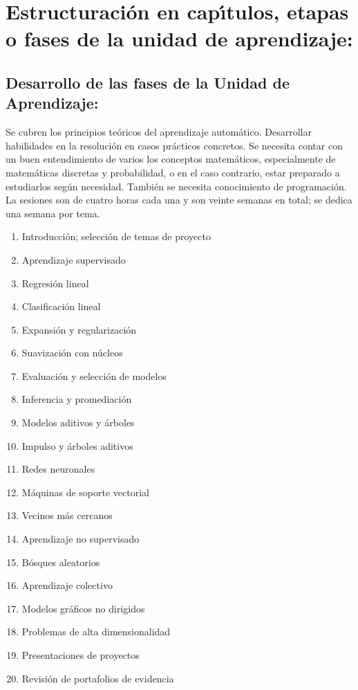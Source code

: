 \documentclass[10 pt]{article}
\begin{document}
\newpage
\section{Estructuraci\'{o}n en cap\'{\i}tulos, etapas o fases de la unidad de
  aprendizaje:}
\subsection{Desarrollo de las fases de la Unidad de Aprendizaje:}

Se cubren los principios te\'{o}ricos del aprendizaje
autom\'{a}tico. Desarrollar habilidades en la resoluci\'{o}n en casos
pr\'{a}cticos concretos. Se necesita contar con un buen entendimiento
de varios los conceptos matem\'{a}ticos, especialmente de
matem\'{a}ticas discretas y probabilidad, o en el caso contrario,
estar preparado a estudiarlos seg\'{u}n necesidad. Tambi\'{e}n se
necesita conocimiento de programaci\'{o}n.  La sesiones son de cuatro
horas cada una y son veinte semanas en total; se dedica una semana por
tema.
\begin{enumerate}[itemsep=-3pt]
\item{Introducci\'{o}n; selecci\'{o}n de temas de proyecto}
\item{Aprendizaje supervisado}
\item{Regresi\'{o}n lineal}
\item{Clasificaci\'{o}n lineal}
\item{Expansi\'{o}n y regularizaci\'{o}n}
\item{Suavizaci\'{o}n con n\'{u}cleos}
\item{Evaluaci\'{o}n y selecci\'{o}n de modelos}
\item{Inferencia y promediaci\'{o}n}
\item{Modelos aditivos y \'{a}rboles}
\item{Impulso y \'{a}rboles aditivos}
\item{Redes neuronales}
\item{M\'{a}quinas de soporte vectorial}
\item{Vecinos m\'{a}s cercanos}
\item{Aprendizaje no supervisado}
\item{B\'{o}sques aleatorios}
\item{Aprendizaje colectivo}
\item{Modelos gr\'{a}ficos no dirigidos}
\item{Problemas de alta dimensionalidad}
\item{Presentaciones de proyectos}
\item{Revisi\'{o}n de portafolios de evidencia}
\end{enumerate}
\end{document}
